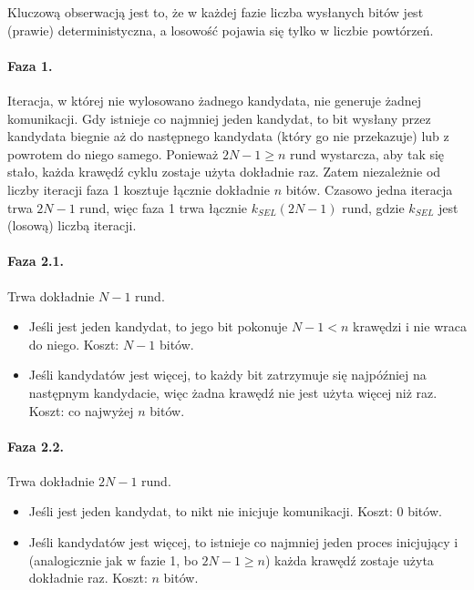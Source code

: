 \documentclass[11pt,a4paper]{article}
\begin{document}
Kluczową obserwacją jest to, że w każdej fazie liczba wysłanych bitów jest (prawie) deterministyczna,
a losowość pojawia się tylko w liczbie powtórzeń.

\paragraph{Faza 1.} Iteracja, w której nie wylosowano żadnego kandydata, nie generuje żadnej komunikacji. Gdy istnieje co najmniej jeden kandydat,
to bit wysłany przez kandydata biegnie aż do następnego kandydata (który go nie przekazuje) lub z powrotem do niego samego. Ponieważ $2N-1 \geq n$ rund wystarcza,
aby tak się stało, każda krawędź cyklu zostaje użyta dokładnie raz. Zatem niezależnie od liczby iteracji faza 1 kosztuje łącznie dokładnie $n$ bitów.
Czasowo jedna iteracja trwa $2N-1$ rund, więc faza 1 trwa łącznie $k_{SEL}(2N-1)$ rund, gdzie $k_{SEL}$ jest (losową) liczbą iteracji.

\paragraph{Faza 2.1.} Trwa dokładnie $N-1$ rund.
\begin{itemize}
    \item Jeśli jest jeden kandydat, to jego bit pokonuje $N-1 < n$ krawędzi i nie wraca do niego. Koszt: $N-1$ bitów.
    \item Jeśli kandydatów jest więcej, to każdy bit zatrzymuje się najpóźniej na następnym kandydacie, więc żadna krawędź nie jest użyta więcej niż raz. Koszt: co najwyżej $n$ bitów.
\end{itemize}

\paragraph{Faza 2.2.} Trwa dokładnie $2N-1$ rund.
\begin{itemize}
    \item Jeśli jest jeden kandydat, to nikt nie inicjuje komunikacji. Koszt: $0$ bitów.
    \item Jeśli kandydatów jest więcej, to istnieje co najmniej jeden proces inicjujący i (analogicznie jak w fazie 1, bo $2N-1 \geq n$) każda krawędź zostaje użyta dokładnie raz. Koszt: $n$ bitów.
\end{itemize}
\end{document}
